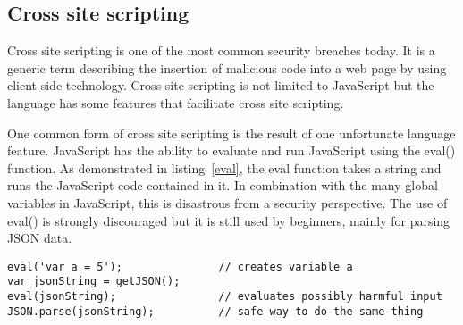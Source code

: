 \subsection{Cross site scripting}
Cross site scripting is one of the most common security breaches today\cite{owasp}. It is a generic term describing the insertion of malicious code into a web page by using client side technology. Cross site scripting is not limited to JavaScript but the language has some features that facilitate cross site scripting.

One common form of cross site scripting is the result of one unfortunate language feature. JavaScript has the ability to evaluate and run JavaScript using the eval() function. As demonstrated in listing~\ref{eval}, the eval function takes a string and runs the JavaScript code contained in it. In combination with the many global variables in JavaScript, this is disastrous from a security perspective. The use of eval() is strongly discouraged but it is still used by beginners, mainly for parsing JSON data.
\begin{lstlisting}[caption={eval().},label={eval}]
eval('var a = 5');               // creates variable a
var jsonString = getJSON();
eval(jsonString);                // evaluates possibly harmful input
JSON.parse(jsonString);          // safe way to do the same thing
\end{lstlisting}

